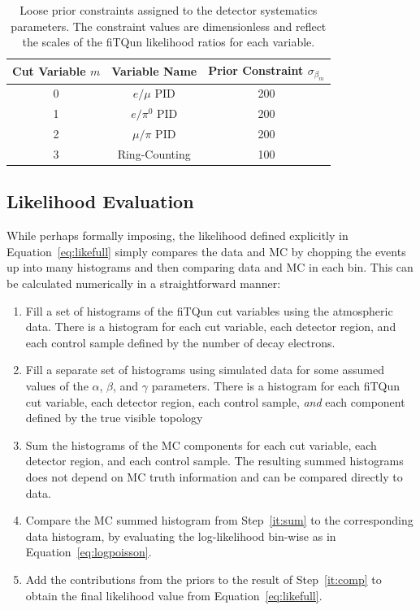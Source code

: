 {\begin{table}[h]
  \centering
  \begin{tabular}{c|c|c}
   \hline\hline
   Cut Variable $m$ & Variable Name & Prior Constraint $\sigma_{\beta_{m}}$ \\
   \hline\hline
   0 & $e/\mu$ PID & 200 \\
   1 & $e/\pi^{0}$ PID & 200 \\
   2 & $\mu/\pi$ PID & 200 \\
   3 & Ring-Counting &100 \\
   \hline\hline
  \end{tabular}
  \caption{Loose prior constraints assigned to the detector systematics parameters. The
  constraint values are dimensionless and reflect the scales of the fiTQun likelihood ratios
  for each variable.}
  \label{tab:betaprior}
\end{table}




\subsection{Likelihood Evaluation}
\label{subsec:evalike}

While perhaps formally imposing, the likelihood defined explicitly in
Equation~\ref{eq:likefull} simply compares the data and MC by chopping the
events up into many histograms and then comparing data and MC in each bin.
This can be calculated numerically in a straightforward manner:

\begin{enumerate}
  \item \label{it:first} Fill a set of histograms of the fiTQun cut variables using the atmospheric data.
    There is a histogram for each cut variable, each detector region,
    and each control sample defined by the number of decay electrons.
  \item
    Fill a separate set of histograms using simulated data for some assumed
    values of the $\alpha$, $\beta$, and $\gamma$ parameters. There is a
    histogram for each fiTQun cut variable, each detector region, each control
    sample, \emph{and} each component defined by the true visible topology
  \item \label{it:sum} Sum the histograms of the MC components for each cut
    variable, each detector region, and each control sample. The resulting summed histograms
    does not depend on MC truth information and can be compared directly to data.
  \item
    \label{it:comp} Compare the MC summed histogram from Step~\ref{it:sum} to
    the corresponding data histogram, by evaluating the log-likelihood bin-wise
    as in Equation~\ref{eq:logpoisson}. 
  \item Add the contributions from the
    priors to the result of Step~\ref{it:comp} to obtain the final likelihood
    value from Equation~\ref{eq:likefull}.
\end{enumerate}

}
